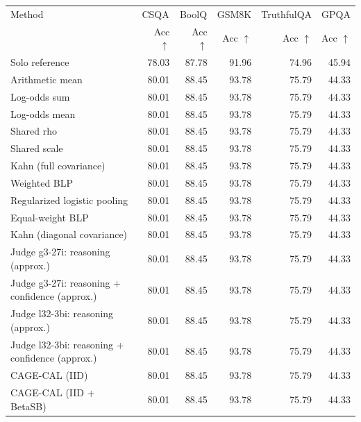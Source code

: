 \begin{tabular}{lrrrrr}
\toprule
Method & \multicolumn{1}{c}{CSQA} & \multicolumn{1}{c}{BoolQ} & \multicolumn{1}{c}{GSM8K} & \multicolumn{1}{c}{TruthfulQA} & \multicolumn{1}{c}{GPQA} \\
 & Acc $\uparrow$ & Acc $\uparrow$ & Acc $\uparrow$ & Acc $\uparrow$ & Acc $\uparrow$ \\
\midrule
Solo reference & 78.03 & 87.78 & 91.96 & 74.96 & 45.94 \\
Arithmetic mean & 80.01 & 88.45 & 93.78 & 75.79 & 44.33 \\
Log-odds sum & 80.01 & 88.45 & 93.78 & 75.79 & 44.33 \\
Log-odds mean & 80.01 & 88.45 & 93.78 & 75.79 & 44.33 \\
Shared rho & 80.01 & 88.45 & 93.78 & 75.79 & 44.33 \\
Shared scale & 80.01 & 88.45 & 93.78 & 75.79 & 44.33 \\
Kahn (full covariance) & 80.01 & 88.45 & 93.78 & 75.79 & 44.33 \\
Weighted BLP & 80.01 & 88.45 & 93.78 & 75.79 & 44.33 \\
Regularized logistic pooling & 80.01 & 88.45 & 93.78 & 75.79 & 44.33 \\
Equal-weight BLP & 80.01 & 88.45 & 93.78 & 75.79 & 44.33 \\
Kahn (diagonal covariance) & 80.01 & 88.45 & 93.78 & 75.79 & 44.33 \\
Judge g3-27i: reasoning (approx.) & 80.01 & 88.45 & 93.78 & 75.79 & 44.33 \\
Judge g3-27i: reasoning + confidence (approx.) & 80.01 & 88.45 & 93.78 & 75.79 & 44.33 \\
Judge l32-3bi: reasoning (approx.) & 80.01 & 88.45 & 93.78 & 75.79 & 44.33 \\
Judge l32-3bi: reasoning + confidence (approx.) & 80.01 & 88.45 & 93.78 & 75.79 & 44.33 \\
CAGE-CAL (IID) & 80.01 & 88.45 & 93.78 & 75.79 & 44.33 \\
CAGE-CAL (IID + BetaSB) & 80.01 & 88.45 & 93.78 & 75.79 & 44.33 \\
\bottomrule
\end{tabular}

